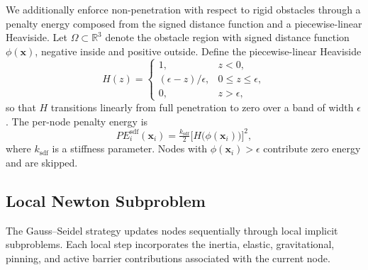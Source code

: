\documentclass[acmtog,anonymous,review]{acmart}
\begin{document}
We additionally enforce non-penetration with respect to rigid
obstacles through a penalty energy composed from the signed distance
function and a piecewise-linear Heaviside. Let
$\Omega \subset \mathbb{R}^3$ denote the obstacle region with signed
distance function $\phi(\mathbf{x})$, negative inside and positive
outside. Define the piecewise-linear Heaviside
\[
H(z) =
\begin{cases}
1, & z < 0, \\
(\epsilon - z) / \epsilon, & 0 \le z \le \epsilon, \\
0, & z > \epsilon,
\end{cases}
\]
so that $H$ transitions linearly from full penetration to zero over
a band of width $\epsilon$. The per-node penalty energy is
\begin{equation}
\label{eq:pe_sdf}
PE_i^{\mathrm{sdf}}(\mathbf{x}_i)
= \tfrac{k_{\mathrm{sdf}}}{2}
\bigl[H\bigl(\phi(\mathbf{x}_i)\bigr)\bigr]^2,
\end{equation}
where $k_{\mathrm{sdf}}$ is a stiffness parameter. Nodes with
$\phi(\mathbf{x}_i) > \epsilon$ contribute zero energy and are
skipped. 
\subsection{Local Newton Subproblem}
\label{sec:local_newton}

The Gauss--Seidel strategy updates nodes sequentially through local
implicit subproblems. Each local step incorporates the inertia,
elastic, gravitational, pinning, and active barrier contributions
associated with the current node.
\end{document}

